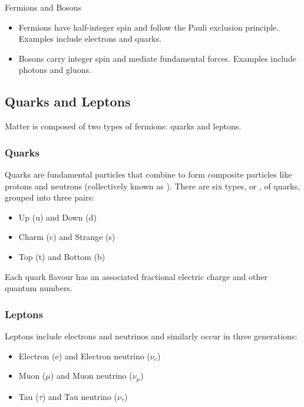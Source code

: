 \begin{keyconcept}{Fermions and Bosons}
\begin{itemize}
    \item Fermions have half-integer spin and follow the Pauli exclusion principle. Examples include electrons and quarks.
    \item Bosons carry integer spin and mediate fundamental forces. Examples include photons and gluons.
\end{itemize}
\end{keyconcept}

\subsection{Quarks and Leptons}
\FloatBarrier

Matter is composed of two types of fermions: quarks and leptons.

\subsubsection{Quarks}

Quarks are fundamental particles that combine to form composite particles like protons and neutrons (collectively known as ). There are six types, or , of quarks, grouped into three pairs:

\begin{itemize}
    \item Up (u) and Down (d)
    \item Charm (c) and Strange (s)
    \item Top (t) and Bottom (b)
\end{itemize}

Each quark flavour has an associated fractional electric charge and other quantum numbers.


\subsubsection{Leptons}

Leptons include electrons and neutrinos and similarly occur in three generations:

\begin{itemize}
    \item Electron (e) and Electron neutrino ($\nu_e$)
    \item Muon ($\mu$) and Muon neutrino ($\nu_\mu$)
    \item Tau ($\tau$) and Tau neutrino ($\nu_\tau$)
\end{itemize}

